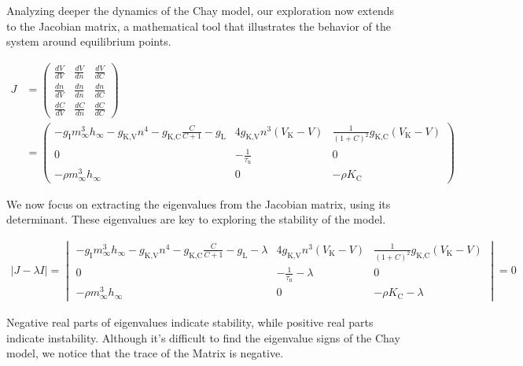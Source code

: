 \documentclass[class={myRUCProject}, crop=false]{standalone}
\begin{document}
Analyzing deeper the dynamics of the Chay model, our exploration now extends to the Jacobian matrix, a mathematical tool that illustrates the behavior of the system around equilibrium points.

\begin{align*}
     J &= \begin{pmatrix}
        \frac{dV}{dV} & \frac{dV}{dn} & \frac{dV}{dC} \\
        \frac{dn}{dV} & \frac{dn}{dn} & \frac{dn}{dC} \\
        \frac{dC}{dV} & \frac{dC}{dn} & \frac{dC}{dC}
    \end{pmatrix} \\
      &= 
    \begin{pmatrix}
        -g_{\text{I}} m_{\infty}^3 h_{\infty} - g_{\text{K,V}} n^4 - g_{\text{K,C}} \frac{C}{C+1} - g_{\text{L}} & 4 g_{\text{K,V}} n^3 (V_{\text{K}} - V) & \frac{1}{(1+C)^2} g_{\text{K,C}} (V_{\text{K}} - V) \\
        0 & -\frac{1}{\tau_{\text{n}}} & 0 \\
        -\rho m_{\infty}^3 h_{\infty} & 0 & -\rho K_{\text{C}}
    \end{pmatrix}
\end{align*}

We now focus on extracting the eigenvalues from the Jacobian matrix, using its determinant. These eigenvalues are key to exploring the stability of the model.

\begin{align*}
    |J - \lambda I| = 
    \begin{vmatrix}
         -g_{\text{I}} m_{\infty}^3 h_{\infty} - g_{\text{K,V}} n^4 - g_{\text{K,C}} \frac{C}{C+1} - g_{\text{L}} - \lambda & 4 g_{\text{K,V}} n^3 (V_{\text{K}} - V) & \frac{1}{(1+C)^2} g_{\text{K,C}} (V_{\text{K}} - V) \\
         0 & -\frac{1}{\tau_{\text{n}}} - \lambda & 0 \\
         -\rho m_{\infty}^3 h_{\infty} & 0 & -\rho K_{\text{C}} - \lambda
    \end{vmatrix} = 0
\end{align*}

Negative real parts of eigenvalues indicate  stability, while positive real parts  indicate instability. Although it's difficult to find the eigenvalue signs of the Chay model, we notice that the trace of the Matrix is negative.
\end{document}
